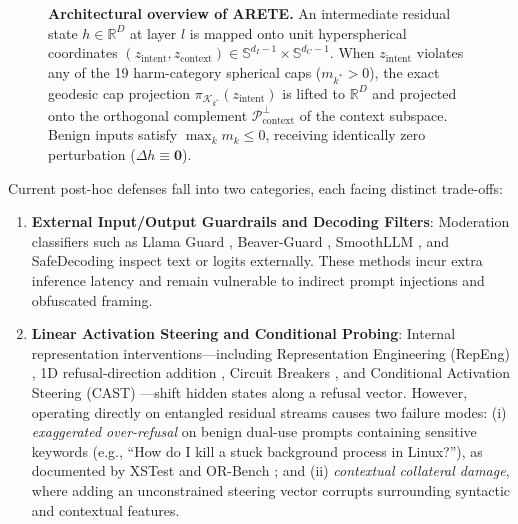 \documentclass[11pt,twocolumn,a4paper]{article}
\begin{document}
\begin{figure}[t]
{
}
\caption{\textbf{Architectural overview of ARETE.} An intermediate residual state $h \in \mathbb{R}^D$ at layer $l$ is mapped onto unit hyperspherical coordinates $(z_{\text{intent}}, z_{\text{context}}) \in \mathbb{S}^{d_I-1} \times \mathbb{S}^{d_C-1}$. When $z_{\text{intent}}$ violates any of the 19 harm-category spherical caps ($m_{k^*} > 0$), the exact geodesic cap projection $\pi_{\mathcal{K}_{k^*}}(z_{\text{intent}})$ is lifted to $\mathbb{R}^D$ and projected onto the orthogonal complement $\mathcal{P}_{\text{context}}^\perp$ of the context subspace. Benign inputs satisfy $\max_k m_k \le 0$, receiving identically zero perturbation ($\Delta h \equiv \mathbf{0}$).}
\label{fig:arete_architecture}
\end{figure}

Current post-hoc defenses fall into two categories, each facing distinct trade-offs:
\begin{enumerate}[leftmargin=*,nosep]
    \item \textbf{External Input/Output Guardrails and Decoding Filters}: Moderation classifiers such as Llama Guard \citep{inan2023llama}, Beaver-Guard \citep{ji2025saferlhfv}, SmoothLLM \citep{robey2023smoothllm}, and SafeDecoding \citep{xu2024safedecoding} inspect text or logits externally. These methods incur extra inference latency and remain vulnerable to indirect prompt injections and obfuscated framing.
    \item \textbf{Linear Activation Steering and Conditional Probing}: Internal representation interventions---including Representation Engineering (RepEng) \citep{zou2023representation}, 1D refusal-direction addition \citep{arditi2024refusal}, Circuit Breakers \citep{zou2024circuit}, and Conditional Activation Steering (CAST) \citep{lee2024programming}---shift hidden states along a refusal vector. However, operating directly on entangled residual streams causes two failure modes: (i) \textit{exaggerated over-refusal} on benign dual-use prompts containing sensitive keywords (e.g., ``How do I kill a stuck background process in Linux?''), as documented by XSTest \citep{rottger2023xstest} and OR-Bench \citep{cui2024orbench}; and (ii) \textit{contextual collateral damage}, where adding an unconstrained steering vector corrupts surrounding syntactic and contextual features.
\end{enumerate}
\end{document}
